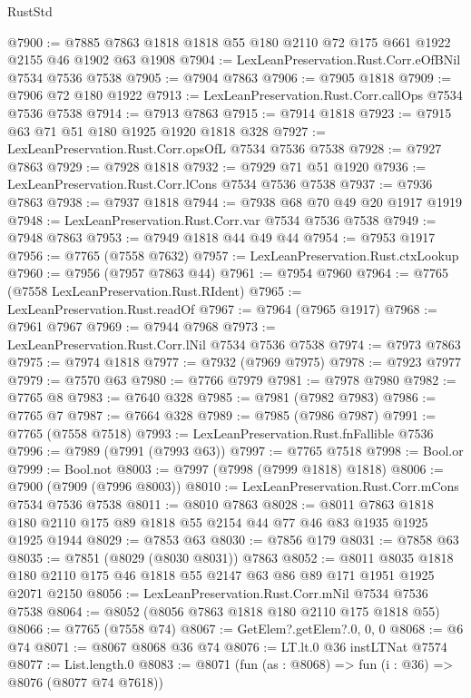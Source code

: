 \begin{lexlean}{RustStd}
\begin{coremodule}
{\begin{coremodule}
{{{{{{{{{{{{{{{{{{{{{{{{{{{{{{{{{{{{{{{{{{{@7900 := @7885 @7863 @1818 @1818 @55 @180 @2110 @72 @175 @661 @1922 @2155 @46 @1902 @63 @1908
@7904 := LexLeanPreservation.Rust.Corr.eOfBNil @7534 @7536 @7538
@7905 := @7904 @7863
@7906 := @7905 @1818
@7909 := @7906 @72 @180 @1922
@7913 := LexLeanPreservation.Rust.Corr.callOps @7534 @7536 @7538
@7914 := @7913 @7863
@7915 := @7914 @1818
@7923 := @7915 @63 @71 @51 @180 @1925 @1920 @1818 @328
@7927 := LexLeanPreservation.Rust.Corr.opsOfL @7534 @7536 @7538
@7928 := @7927 @7863
@7929 := @7928 @1818
@7932 := @7929 @71 @51 @1920
@7936 := LexLeanPreservation.Rust.Corr.lCons @7534 @7536 @7538
@7937 := @7936 @7863
@7938 := @7937 @1818
@7944 := @7938 @68 @70 @49 @20 @1917 @1919
@7948 := LexLeanPreservation.Rust.Corr.var @7534 @7536 @7538
@7949 := @7948 @7863
@7953 := @7949 @1818 @44 @49 @44
@7954 := @7953 @1917
@7956 := @7765 (@7558 @7632)
@7957 := LexLeanPreservation.Rust.ctxLookup
@7960 := @7956 (@7957 @7863 @44)
@7961 := @7954 @7960
@7964 := @7765 (@7558 LexLeanPreservation.Rust.RIdent)
@7965 := LexLeanPreservation.Rust.readOf
@7967 := @7964 (@7965 @1917)
@7968 := @7961 @7967
@7969 := @7944 @7968
@7973 := LexLeanPreservation.Rust.Corr.lNil @7534 @7536 @7538
@7974 := @7973 @7863
@7975 := @7974 @1818
@7977 := @7932 (@7969 @7975)
@7978 := @7923 @7977
@7979 := @7570 @63
@7980 := @7766 @7979
@7981 := @7978 @7980
@7982 := @7765 @8
@7983 := @7640 @328
@7985 := @7981 (@7982 @7983)
@7986 := @7765 @7
@7987 := @7664 @328
@7989 := @7985 (@7986 @7987)
@7991 := @7765 (@7558 @7518)
@7993 := LexLeanPreservation.Rust.fnFallible @7536
@7996 := @7989 (@7991 (@7993 @63))
@7997 := @7765 @7518
@7998 := Bool.or
@7999 := Bool.not
@8003 := @7997 (@7998 (@7999 @1818) @1818)
@8006 := @7900 (@7909 (@7996 @8003))
@8010 := LexLeanPreservation.Rust.Corr.mCons @7534 @7536 @7538
@8011 := @8010 @7863
@8028 := @8011
    @7863
    @1818
    @180
    @2110
    @175
    @89
    @1818
    @55
    @2154
    @44
    @77
    @46
    @83
    @1935
    @1925
    @1925
    @1944
@8029 := @7853 @63
@8030 := @7856 @179
@8031 := @7858 @63
@8035 := @7851 (@8029 (@8030 @8031)) @7863
@8052 := @8011
    @8035
    @1818
    @180
    @2110
    @175
    @46
    @1818
    @55
    @2147
    @63
    @86
    @89
    @171
    @1951
    @1925
    @2071
    @2150
@8056 := LexLeanPreservation.Rust.Corr.mNil @7534 @7536 @7538
@8064 := @8052 (@8056 @7863 @1818 @180 @2110 @175 @1818 @55)
@8066 := @7765 (@7558 @74)
@8067 := GetElem?.getElem?.{0, 0, 0}
@8068 := @6 @74
@8071 := @8067 @8068 @36 @74
@8076 := LT.lt.{0} @36 instLTNat @7574
@8077 := List.length.{0}
@8083 := @8071 (fun (as : @8068) => fun (i : @36) => @8076 (@8077 @74 @7618))
}}}}}}}}}}}}}}}}}}}}}}}}}}}}}}}}}}}}}}}}}}}
\end{coremodule}}
\end{coremodule}
\end{lexlean}

